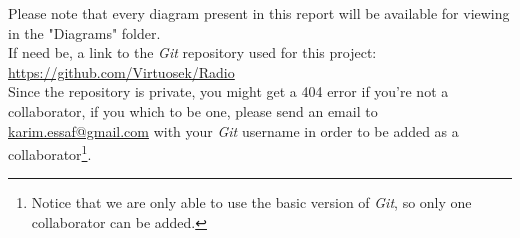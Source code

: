 \documentclass[11pt]{article}
\begin{document}
\pagebreak
Please note that every diagram present in this report will be available for viewing in the "Diagrams" folder.\\

If need be, a link to the \textit{Git} repository used for this project:\\\vspace{20px}
\url{https://github.com/Virtuosek/Radio}\\
Since the repository is private, you might get a 404 error if you're not a collaborator, if you which to be one, please send an email to \href{mailto:karim.essaf@gmail.com}{karim.essaf@gmail.com} with your \textit{Git} username in order to be added as a collaborator\footnote{Notice that we are only able to use the basic version of \textit{Git}, so only one collaborator can be added.}.
\end{document}

